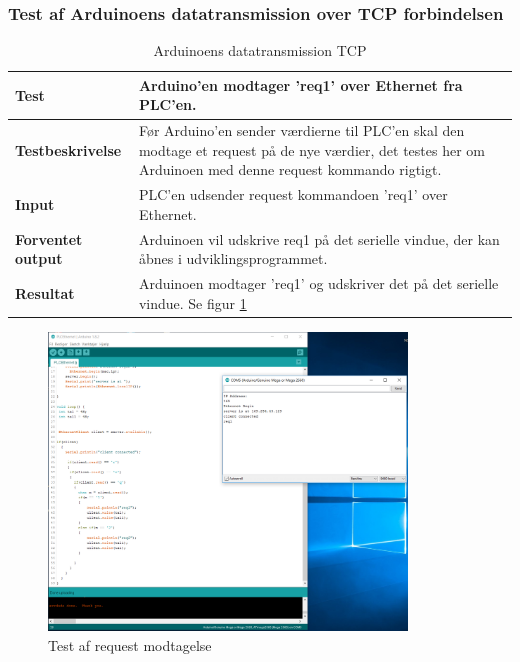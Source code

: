 \subsubsection{Test af Arduinoens datatransmission over TCP forbindelsen}
\begin{table}
	\centering
	\begin{tabular}{ | m{} | m{}|} 
		\hline
		\textbf{Test}					&Arduino'en modtager 'req1' over Ethernet fra PLC'en.  \\ \hline
		\textbf{Testbeskrivelse}		&Før Arduino'en sender værdierne til PLC'en skal den modtage et request på de nye værdier, det testes her om Arduinoen med denne request kommando rigtigt.  \\ \hline
		\textbf{Input}					& PLC'en udsender request kommandoen 'req1' over Ethernet.\\ \hline
		\textbf{Forventet output}		&Arduinoen vil udskrive req1 på det serielle vindue, der kan åbnes i udviklingsprogrammet. \\ \hline
		\textbf{Resultat}				&Arduinoen modtager 'req1' og udskriver det på det serielle vindue. Se figur  \ref{fig:RequestModtagelse} \\ \hline
	\end{tabular}
	\caption{Arduinoens datatransmission TCP} 
	\label{tab:ArduinoTCP}
\end{table}

\begin{figure}[H] %
	\centering
	\includegraphics[width=0.85\textwidth]{Test/ModultestStyringsenhed/EthernettestArduinoTerminal}
	\caption{Test af request modtagelse}
	\label{fig:RequestModtagelse}
\end{figure}

